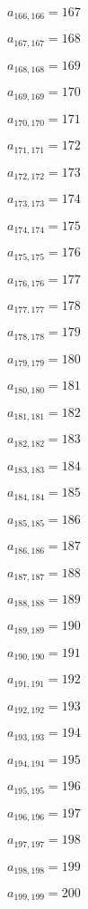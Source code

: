 \documentclass[a4paper,12pt]{article}
\begin{document}
$a _{ 166, 166 } = 167$

$a _{ 167, 167 } = 168$

$a _{ 168, 168 } = 169$

$a _{ 169, 169 } = 170$

$a _{ 170, 170 } = 171$

$a _{ 171, 171 } = 172$

$a _{ 172, 172 } = 173$

$a _{ 173, 173 } = 174$

$a _{ 174, 174 } = 175$

$a _{ 175, 175 } = 176$

$a _{ 176, 176 } = 177$

$a _{ 177, 177 } = 178$

$a _{ 178, 178 } = 179$

$a _{ 179, 179 } = 180$

$a _{ 180, 180 } = 181$

$a _{ 181, 181 } = 182$

$a _{ 182, 182 } = 183$

$a _{ 183, 183 } = 184$

$a _{ 184, 184 } = 185$

$a _{ 185, 185 } = 186$

$a _{ 186, 186 } = 187$

$a _{ 187, 187 } = 188$

$a _{ 188, 188 } = 189$

$a _{ 189, 189 } = 190$

$a _{ 190, 190 } = 191$

$a _{ 191, 191 } = 192$

$a _{ 192, 192 } = 193$

$a _{ 193, 193 } = 194$

$a _{ 194, 194 } = 195$

$a _{ 195, 195 } = 196$

$a _{ 196, 196 } = 197$

$a _{ 197, 197 } = 198$

$a _{ 198, 198 } = 199$

$a _{ 199, 199 } = 200$
\end{document}
